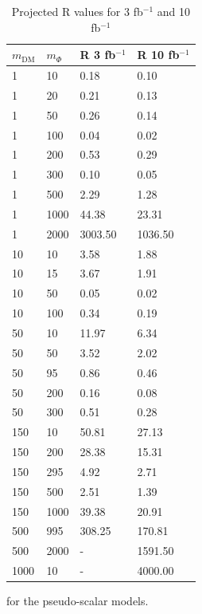 \begin{table}[h]
\centering
\begin{tabular}{llll}
\hline                      
 $m_\textrm{DM}$ & $m_\Phi$  & R 3 fb$^{-1}$ & R 10 fb$^{-1}$ \\ \hline
1       & 10      & 0.18    & 0.10 \\ \hline
1       & 20      & 0.21    & 0.13 \\ \hline
1       & 50      & 0.26    & 0.14 \\ \hline
1       & 100     & 0.04    & 0.02 \\ \hline
1       & 200     & 0.53    & 0.29 \\ \hline
1       & 300     & 0.10    & 0.05 \\ \hline
1       & 500     & 2.29    & 1.28 \\ \hline
1       & 1000    & 44.38   & 23.31 \\ \hline
1       & 2000    & 3003.50 & 1036.50 \\ \hline
10      & 10      & 3.58    & 1.88 \\ \hline
10      & 15      & 3.67    & 1.91 \\ \hline
10      & 50      & 0.05    & 0.02 \\ \hline
10      & 100     & 0.34    & 0.19 \\ \hline
50      & 10      & 11.97   & 6.34 \\ \hline
50      & 50      & 3.52    & 2.02 \\ \hline
50      & 95      & 0.86    & 0.46 \\ \hline
50      & 200     & 0.16    & 0.08 \\ \hline
50      & 300     & 0.51    & 0.28 \\ \hline
150     & 10      & 50.81   & 27.13 \\ \hline
150     & 200     & 28.38   & 15.31 \\ \hline
150     & 295     & 4.92    & 2.71 \\ \hline
150     & 500     & 2.51    & 1.39 \\ \hline
150     & 1000    & 39.38   & 20.91 \\ \hline
500     & 995     & 308.25  & 170.81 \\ \hline
500     & 2000    & -       & 1591.50 \\ \hline
1000    & 10      & -       & 4000.00 \\ \hline
\end{tabular}
\caption{Projected R values for 3 fb$^{-1}$ and 10 fb$^{-1}$} for the pseudo-scalar models.
\label{tab:dm_P_R_values}
\end{table}


